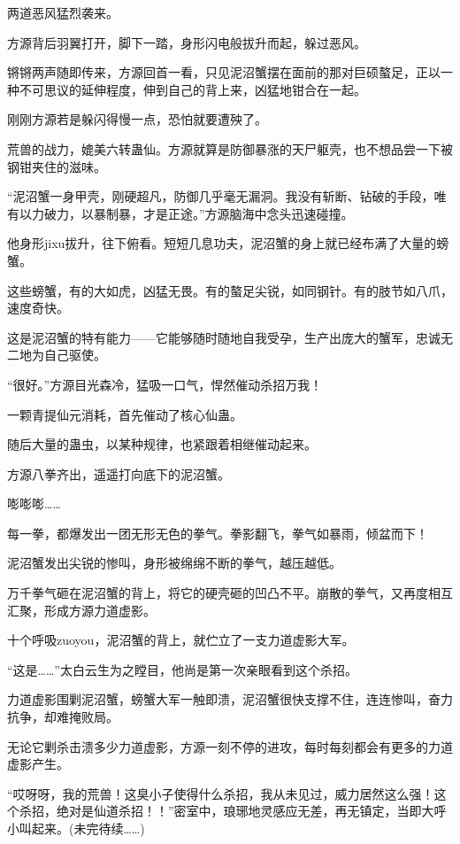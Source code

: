 \begin{this_body}
两道恶风猛烈袭来。

方源背后羽翼打开，脚下一踏，身形闪电般拔升而起，躲过恶风。

锵锵两声随即传来，方源回首一看，只见泥沼蟹摆在面前的那对巨硕螯足，正以一种不可思议的延伸程度，伸到自己的背上来，凶猛地钳合在一起。

刚刚方源若是躲闪得慢一点，恐怕就要遭殃了。

荒兽的战力，媲美六转蛊仙。方源就算是防御暴涨的天尸躯壳，也不想品尝一下被钢钳夹住的滋味。

“泥沼蟹一身甲壳，刚硬超凡，防御几乎毫无漏洞。我没有斩断、钻破的手段，唯有以力破力，以暴制暴，才是正途。”方源脑海中念头迅速碰撞。

他身形jixu拔升，往下俯看。短短几息功夫，泥沼蟹的身上就已经布满了大量的螃蟹。

这些螃蟹，有的大如虎，凶猛无畏。有的螯足尖锐，如同钢针。有的肢节如八爪，速度奇快。

这是泥沼蟹的特有能力——它能够随时随地自我受孕，生产出庞大的蟹军，忠诚无二地为自己驱使。

“很好。”方源目光森冷，猛吸一口气，悍然催动杀招万我！

一颗青提仙元消耗，首先催动了核心仙蛊。

随后大量的蛊虫，以某种规律，也紧跟着相继催动起来。

方源八拳齐出，遥遥打向底下的泥沼蟹。

嘭嘭嘭……

每一拳，都爆发出一团无形无色的拳气。拳影翻飞，拳气如暴雨，倾盆而下！

泥沼蟹发出尖锐的惨叫，身形被绵绵不断的拳气，越压越低。

万千拳气砸在泥沼蟹的背上，将它的硬壳砸的凹凸不平。崩散的拳气，又再度相互汇聚，形成方源力道虚影。

十个呼吸zuoyou，泥沼蟹的背上，就伫立了一支力道虚影大军。

“这是……”太白云生为之瞠目，他尚是第一次亲眼看到这个杀招。

力道虚影围剿泥沼蟹，螃蟹大军一触即溃，泥沼蟹很快支撑不住，连连惨叫，奋力抗争，却难掩败局。

无论它剿杀击溃多少力道虚影，方源一刻不停的进攻，每时每刻都会有更多的力道虚影产生。

“哎呀呀，我的荒兽！这臭小子使得什么杀招，我从未见过，威力居然这么强！这个杀招，绝对是仙道杀招！！”密室中，琅琊地灵感应无差，再无镇定，当即大呼小叫起来。(未完待续……)

\end{this_body}

